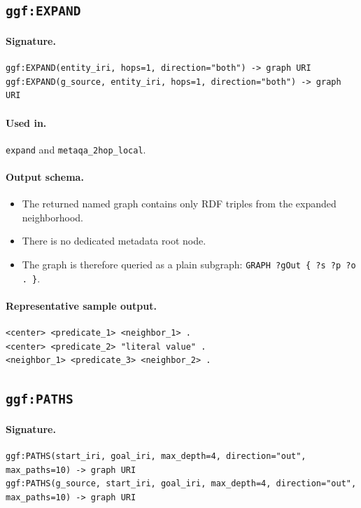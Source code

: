 \subsection{\texttt{ggf:EXPAND}}
\label{subsec:ggf-expand}

\paragraph{Signature.}
\begin{verbatim}
ggf:EXPAND(entity_iri, hops=1, direction="both") -> graph URI
ggf:EXPAND(g_source, entity_iri, hops=1, direction="both") -> graph URI
\end{verbatim}

\paragraph{Used in.}
\texttt{expand} and \texttt{metaqa\_2hop\_local}.

\paragraph{Output schema.}
\begin{itemize}
\item The returned named graph contains only RDF triples from the expanded
neighborhood.
\item There is no dedicated metadata root node.
\item The graph is therefore queried as a plain subgraph:
\texttt{GRAPH ?gOut \{ ?s ?p ?o . \}}.
\end{itemize}

\paragraph{Representative sample output.}
\begin{verbatim}
<center> <predicate_1> <neighbor_1> .
<center> <predicate_2> "literal value" .
<neighbor_1> <predicate_3> <neighbor_2> .
\end{verbatim}

\subsection{\texttt{ggf:PATHS}}
\label{subsec:ggf-paths}

\paragraph{Signature.}
\begin{verbatim}
ggf:PATHS(start_iri, goal_iri, max_depth=4, direction="out", max_paths=10) -> graph URI
ggf:PATHS(g_source, start_iri, goal_iri, max_depth=4, direction="out", max_paths=10) -> graph URI
\end{verbatim}

